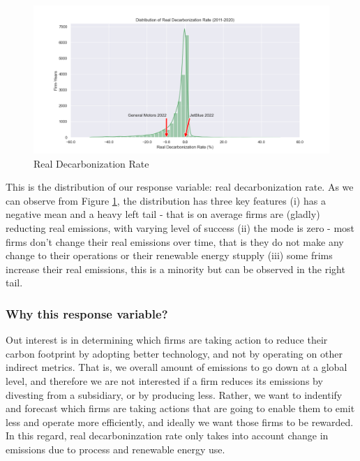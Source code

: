 \begin{figure}[H]
    \begin{center}
    \includegraphics[width=5in]{figures/ghg_change_real_dist.png}
    \caption{Real Decarbonization Rate}
    \label{fig:next-year-real-decarbonization-rate}
    \end{center}
\end{figure}

\noindent This is the distribution of our response variable: real decarbonization rate. As we can observe from Figure \ref{fig:next-year-real-decarbonization-rate}, the distribution has three key features (i) has a negative mean and a heavy left tail - that is on average firms are (gladly) reducting real emissions, with varying level of success (ii) the mode is zero - most firms don't change their real emissions over time, that is they do not make any change to their operations or their renewable energy stupply (iii) some frims increase their real emissions, this is a minority but can be observed in the right tail. 

\subsubsection{Why this response variable?}
Out interest is in determining which firms are taking action to reduce their carbon footprint by adopting better technology, and not by operating on other indirect metrics. That is, we overall amount of emissions to go down at a global level, and therefore we are not interested if a firm reduces its emissions by divesting from a subsidiary, or by producing less. Rather, we want to indentify and forecast which firms are taking actions that are going to enable them to emit less and operate more efficiently, and ideally we want those firms to be rewarded. In this regard, real decarboninzation rate only takes into account change in emissions due to process and renewable energy use. 

